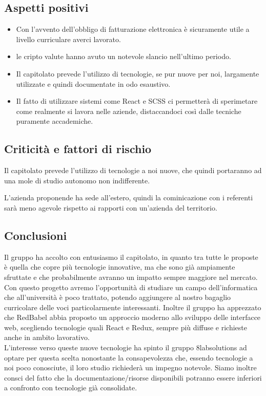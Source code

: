 \subsection{Aspetti positivi}
\begin{itemize}
	\item Con l'avvento dell'obbligo di fatturazione elettronica è sicuramente
	utile a livello curriculare averci lavorato.
	\item le cripto valute hanno avuto un notevole slancio nell'ultimo periodo.
	\item Il capitolato prevede l'utilizzo di tecnologie, se pur nuove per noi,
	largamente utilizzate e quindi documentate in odo esaustivo.
	\item Il fatto di utilizzare sistemi come React e SCSS ci permetterà di
	sperimetare come realmente si lavora nelle aziende, distaccandoci così dalle
	tecniche puramente accademiche.
\end{itemize}

\subsection{Criticità e fattori di rischio}
\begin{itemsize}
	\item Il capitolato prevede l'utilizzo di tecnologie a noi nuove, che quindi portaranno ad una mole di studio autonomo non indifferente.
	\item L'azienda proponende ha sede all'estero, quindi la cominicazione con i referenti sarà meno agevole rispetto ai rapporti con un'azienda del territorio.
\end{itemsize}

\subsection{Conclusioni} Il gruppo ha accolto con entusiasmo il capitolato, in quanto tra tutte le proposte è quella che copre più tecnologie innovative, ma che sono già ampiamente sfruttate e che probabilmente avranno un impatto sempre maggiore nel mercato. Con questo progetto avremo l'opportunità di studiare un campo dell'informatica che all'università è poco trattato, potendo aggiungere al nostro bagaglio curricolare delle voci particolarmente interessanti. Inoltre il gruppo ha apprezzato che RedBabel abbia proposto un approccio moderno allo sviluppo delle interfacce web, scegliendo tecnologie quali React e Redux, sempre più diffuse e richieste anche in ambito lavorativo.\\
 L'interesse verso queste nuove tecnologie ha spinto il gruppo 8labsolutions ad optare per questa scelta nonostante la consapevolezza che, essendo tecnologie a noi poco conosciute, il loro studio richiederà un impegno notevole. Siamo inoltre consci del fatto che la documentazione/risorse disponibili potranno essere inferiori a confronto con tecnologie già consolidate.
